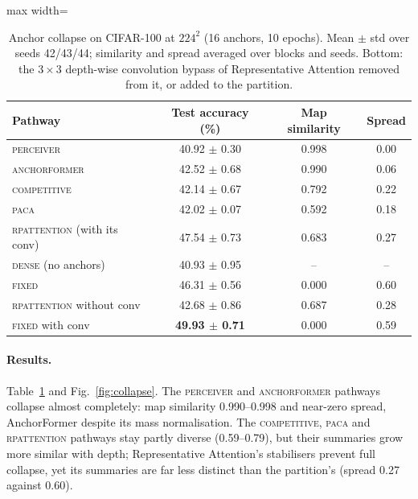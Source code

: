 \documentclass[runningheads]{llncs}
\newcommand{\fixed}{\textsc{fixed}}
\begin{document}
\begin{table}[t]
\centering
\caption{Anchor collapse on CIFAR-100 at $224^2$ (16 anchors, 10 epochs). Mean $\pm$ std over
seeds 42/43/44; similarity and spread averaged over blocks and seeds. Bottom: the $3\times3$
depth-wise convolution bypass of Representative Attention removed from it, or added to the
partition.}
\label{tab:collapse}
\begin{adjustbox}{max width=\linewidth}
\begin{tabular}{lccc}
\toprule
Pathway & Test accuracy (\%) & Map similarity & Spread \\
\midrule
\textsc{perceiver} & 40.92 $\pm$ 0.30 & 0.998 & 0.00 \\
\textsc{anchorformer} & 42.52 $\pm$ 0.68 & 0.990 & 0.06 \\
\textsc{competitive} & 42.14 $\pm$ 0.67 & 0.792 & 0.22 \\
\textsc{paca} & 42.02 $\pm$ 0.07 & 0.592 & 0.18 \\
\textsc{rpattention} (with its conv) & 47.54 $\pm$ 0.73 & 0.683 & 0.27 \\
\textsc{dense} (no anchors) & 40.93 $\pm$ 0.95 & -- & -- \\
\fixed{} & 46.31 $\pm$ 0.56 & 0.000 & 0.60 \\
\midrule
\textsc{rpattention} without conv & 42.68 $\pm$ 0.86 & 0.687 & 0.28 \\
\fixed{} with conv & \textbf{49.93 $\pm$ 0.71} & 0.000 & 0.59 \\
\bottomrule
\end{tabular}
\end{adjustbox}
\end{table}

\paragraph{Results.} Table~\ref{tab:collapse} and Fig.~\ref{fig:collapse}. The
\textsc{perceiver} and \textsc{anchorformer} pathways collapse almost completely: map similarity
0.990--0.998 and near-zero spread, AnchorFormer despite its mass normalisation. The
\textsc{competitive}, \textsc{paca} and \textsc{rpattention} pathways stay partly diverse
(0.59--0.79), but their summaries grow more similar with depth; Representative Attention's
stabilisers prevent full collapse, yet its summaries are far less distinct than the partition's
(spread 0.27 against 0.60).
\end{document}
